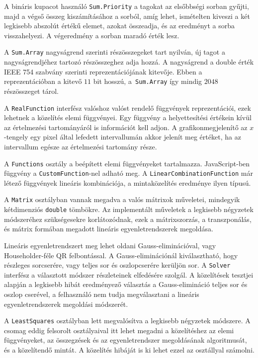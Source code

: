 A bináris kupacot használó \texttt{Sum.Priority} a tagokat az elsőbbségi sorban gyűjti, majd a végső összeg kiszámításához a sorból, amíg lehet, ismételten kiveszi a két legkisebb abszolút értékű elemet, azokat összeadja, és az eredményt a sorba visszahelyezi.
A végeredmény a sorban maradó érték lesz.

A \texttt{Sum.Array} nagyságrend szerinti részösszegeket tart nyilván, új tagot a nagyságrendjéhez tartozó részösszeghez adja hozzá.
A nagyságrend a double érték IEEE 754 szabvány szerinti reprezentációjának kitevője. Ebben a reprezentációban a kitevő $11$ bit hosszú, a\texttt{ Sum.Array} így mindig $2048$ részösszeget tárol.

A \texttt{RealFunction} interfész valóshoz valóst rendelő függvények reprezentációi, ezek lehetnek a közelítés elemi függvényei.
Egy függvény a helyettesítési értékein kívül az értelmezési tartományáról is információt kell adjon.
A grafikonmegjelenítő az $x$-tengely egy pixel által lefedett intervallumán akkor jelenít meg értéket, ha az intervallum egésze az értelmezési tartomány része.

A \texttt{Functions} osztály a beépített elemi függvényeket tartalmazza.
JavaScript-ben függvény a \texttt{CustomFunction}-nel adható meg.
A \texttt{LinearCombinationFunction} már létező függvények lineáris kombinációja, a mintaközelítés eredménye ilyen típusú.

A \texttt{Matrix} osztályban vannak megadva a valós mátrixok műveletei, mindegyik kétdimenziós \texttt{double} tömbökre.
Az implementált műveletek a legkisebb négyzetek módszeréhez szükségesekre korlátozódnak, ezek a mátrixszorzás, a transzponálás, és mátrix formában megadott lineáris egyenletrendszerek megoldása.

Lineáris egyenletrendszert meg lehet oldani Gauss-eliminációval, vagy Householder-féle QR felbontással.
A Gauss-eliminációnál kiválasztható, hogy részleges sorcserére, vagy teljes sor és oszlopcserére kerüljön sor.
A \texttt{Solver} interfész a választott módszer részleteinek elfedésére szolgál.
A közelítések tesztjei alapján a legkisebb hibát eredményező választás a Gauss-elimináció teljes sor és oszlop cserével, a felhasználó nem tudja megválasztani a lineáris egyenletrendszerek megoldási módszerét.

A \texttt{LeastSquares} osztályban lett megvalósítva a legkisebb négyzetek módszere.
A csomag eddig felsorolt osztályaival itt lehet megadni a közelítéshez az elemi függvényeket, az összegzések és az egyenletrendszer megoldásának algoritmusát, és a közelítendő mintát.
A közelítés hibáját is ki lehet ezzel az osztállyal számolni.

